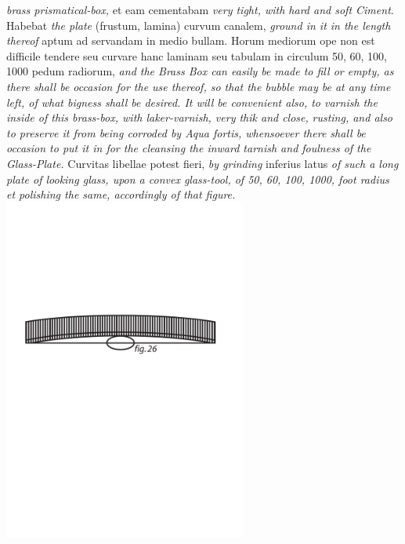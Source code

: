 \noindent \textit{brass prismatical-box,} et eam cementabam \textit{very tight, with hard and soft Ciment}. Habebat \textit{the plate} (frustum, lamina) curvum canalem, \textit{ground in it in the length thereof} aptum ad servandam in medio bullam. Horum mediorum ope non est difficile tendere seu curvare hanc laminam seu tabulam in circulum 50, 60, 100, 1000 pedum radiorum, \textit{and the Brass Box can easily be made to fill or empty, as there shall be occasion for the use thereof, so that the bubble may be at any time left, of what bigness shall be desired. It will be convenient also, to varnish the inside of this brass-box, with laker-varnish, very thik and close, } \textit{rusting, and also to preserve it from being corroded by Aqua fortis, whensoever there shall be occasion to put it in for the cleansing the inward tarnish and foulness of the Glass-Plate.} Curvitas  libellae potest fieri, \textit{by grinding} inferius latus \textit{of such a long plate of looking glass, upon a convex glass-tool, of 50, 60, 100, 1000, foot radius et polishing the same, accordingly of that figure.}
\pend
\vspace{3.5em}
\pstart
\count{}
\count{}
\count{} 
\centering \includegraphics[trim = 0mm -1mm 0mm 0mm, clip, width=0.6\textwidth]{images/LH0351506_014r-d1.pdf}\\
